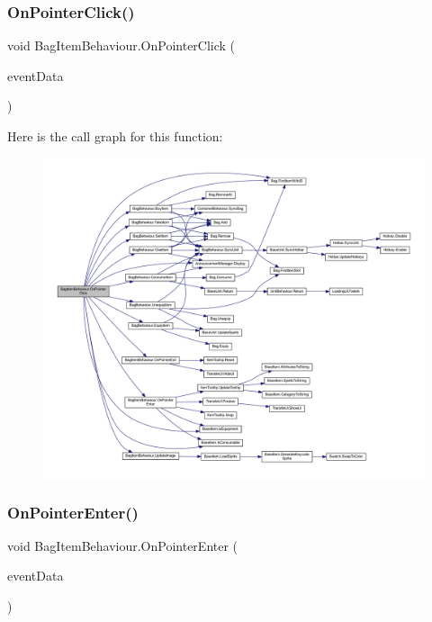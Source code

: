 \subsubsection{\texorpdfstring{OnPointerClick()}{OnPointerClick()}}
{\footnotesize\ttfamily void Bag\+Item\+Behaviour.\+On\+Pointer\+Click (\begin{DoxyParamCaption}\item[{Pointer\+Event\+Data}]{event\+Data }\end{DoxyParamCaption})}

Here is the call graph for this function\+:
\nopagebreak
\begin{figure}[H]
\begin{center}
\leavevmode
\includegraphics[width=350pt]{class_bag_item_behaviour_a81455fb5bdcd5a14ca9440c0f9581708_cgraph}
\end{center}
\end{figure}
\mbox{\label{class_bag_item_behaviour_a9dd6c0fb07dd87363f0198070a16cff7}} 
\subsubsection{\texorpdfstring{OnPointerEnter()}{OnPointerEnter()}}
{\footnotesize\ttfamily void Bag\+Item\+Behaviour.\+On\+Pointer\+Enter (\begin{DoxyParamCaption}\item[{Pointer\+Event\+Data}]{event\+Data }\end{DoxyParamCaption})}

